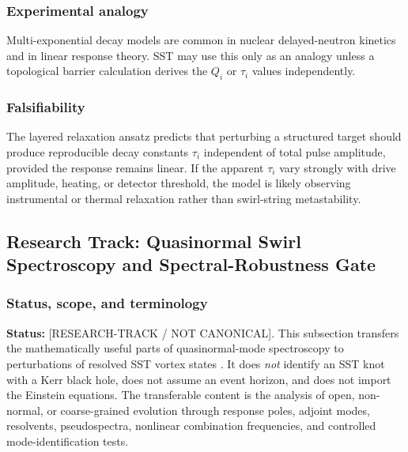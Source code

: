     \subsubsection*{Experimental analogy}
        
        Multi-exponential decay models are common in nuclear delayed-neutron kinetics and in linear response theory. SST may use this only as an analogy unless a topological barrier calculation derives the \(Q_i\) or \(\tau_i\) values independently.
    
    \subsubsection*{Falsifiability}
        
        The layered relaxation ansatz predicts that perturbing a structured target should produce reproducible decay constants \(\tau_i\) independent of total pulse amplitude, provided the response remains linear. If the apparent \(\tau_i\) vary strongly with drive amplitude, heating, or detector threshold, the model is likely observing instrumental or thermal relaxation rather than swirl-string metastability.


\subsection{Research Track: Quasinormal Swirl Spectroscopy and Spectral-Robustness Gate}
    \label{sec:rt_quasinormal_swirl_spectroscopy}

    \subsubsection*{Status, scope, and terminology}

        \noindent
        \textbf{Status:} [RESEARCH-TRACK / NOT CANONICAL].
        This subsection transfers the mathematically useful parts of quasinormal-mode
        spectroscopy to perturbations of resolved SST vortex states
        \cite{BertiEtAl2026BlackHoleSpectroscopy}.  It does \emph{not} identify an SST
        knot with a Kerr black hole, does not assume an event horizon, and does not
        import the Einstein equations.  The transferable content is the analysis of
        open, non-normal, or coarse-grained evolution through response poles,
        adjoint modes, resolvents, pseudospectra, nonlinear combination frequencies,
        and controlled mode-identification tests.

